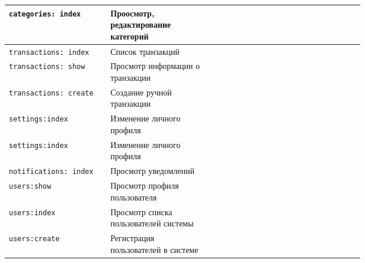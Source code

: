 \begin{center}
\begin{longtable}{|p{0.2\linewidth}|p{0.2\linewidth}|p{0.05\linewidth}|p{0.05\linewidth}|p{0.05\linewidth}|p{0.05\linewidth}|p{0.05\linewidth}|p{0.05\linewidth}|}
\texttt{categories: index} & Проосмотр, редактирование категорий & {\color{red}{НЕТ}} & {\color{green}{ДА}} & {\color{red}{НЕТ}} & {\color{red}{НЕТ}} &  {\color{red}{НЕТ}} &  {\color{red}{НЕТ}} \\ \hline

\texttt{transactions: index} & Список транзакций & {\color{red}{НЕТ}} & {\color{green}{ДА}} & {\color{red}{НЕТ}} & {\color{red}{НЕТ}} &  {\color{red}{НЕТ}} &  {\color{red}{НЕТ}} \\ \hline

\texttt{transactions: show} & Просмотр информации о транзакции & {\color{red}{НЕТ}} & {\color{green}{ДА}} & {\color{red}{НЕТ}} & {\color{red}{НЕТ}} &  {\color{red}{НЕТ}} &  {\color{red}{НЕТ}} \\ \hline

\texttt{transactions: create} & Создание ручной транзакции & {\color{red}{НЕТ}} & {\color{green}{ДА}} & {\color{red}{НЕТ}} & {\color{red}{НЕТ}} &  {\color{red}{НЕТ}} &  {\color{red}{НЕТ}} \\ \hline

\texttt{settings:index} & Изменение личного профиля & {\color{green}{ДА}} & {\color{green}{ДА}} & {\color{green}{ДА}} & {\color{green}{ДА}} &  {\color{green}{ДА}} &  {\color{red}{НЕТ}} \\ \hline

\texttt{settings:index} & Изменение личного профиля & {\color{green}{ДА}} & {\color{green}{ДА}} & {\color{green}{ДА}} & {\color{green}{ДА}} &  {\color{green}{ДА}} &  {\color{red}{НЕТ}} \\ \hline

\texttt{notifications: index} & Просмотр уведомлений & {\color{green}{ДА}} & {\color{green}{ДА}} & {\color{green}{ДА}} & {\color{green}{ДА}} &  {\color{green}{ДА}} &  {\color{red}{НЕТ}} \\ \hline

\texttt{users:show} & Просмотр профиля пользователя & {\color{green}{ДА}} & {\color{green}{ДА}} & {\color{green}{ДА}} & {\color{green}{ДА}} & {\color{red}{НЕТ}} &  {\color{red}{НЕТ}} \\ \hline


\texttt{users:index} & Просмотр списка пользователей системы & {\color{green}{ДА}} &  {\color{red}{НЕТ}} &  {\color{red}{НЕТ}} &  {\color{red}{НЕТ}} & {\color{red}{НЕТ}} &  {\color{red}{НЕТ}} \\ \hline

\texttt{users:create} & Регистрация пользователей в системе & {\color{green}{ДА}} &  {\color{red}{НЕТ}} &  {\color{red}{НЕТ}} &  {\color{red}{НЕТ}} & {\color{red}{НЕТ}} &  {\color{red}{НЕТ}} \\ \hline


\end{longtable}
\end{center}

